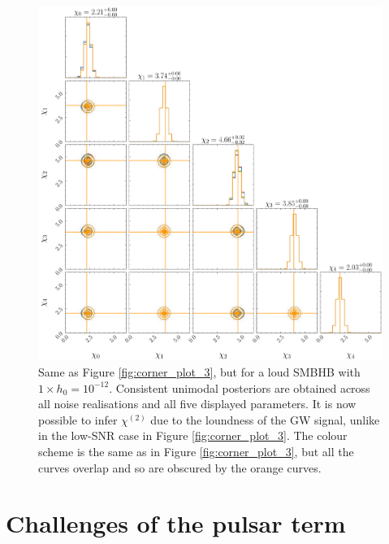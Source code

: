 \documentclass[fleqn,usenatbib,useAMS]{mnras}
\begin{document}
\begin{figure}
	\includegraphics[width=\columnwidth, height = \columnwidth ]{images/corner_highSNR_chi} 	
	\caption{Same as Figure \ref{fig:corner_plot_3}, but for a loud SMBHB with $1 \times h_0 = 10^{-12}$.  Consistent unimodal posteriors are obtained across all noise realisations and all five displayed parameters. It is now possible to infer $\chi^{(2)}$ due to the loundness of the GW signal, unlike in the low-SNR case in Figure \ref{fig:corner_plot_3}. The colour scheme is the same as in Figure \ref{fig:corner_plot_3}, but all the curves overlap and so are obscured by the orange curves.}
	\label{fig:corner_high_snr_appendix_chi}
\end{figure}


\section{Challenges of the pulsar term}\label{sec:psr_term_challenges}
\end{document}

